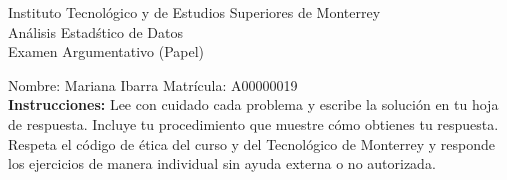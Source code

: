 \documentclass[10pt]{report}
\begin{document}
\newpage



\begin{center}
{\large Instituto Tecnol\'{o}gico y de Estudios Superiores de Monterrey \\
An\'alisis Estad\'stico de Datos } \\
Examen Argumentativo (Papel)
\end{center}

Nombre: \underline{\hspace*{.2in}}
Mariana Ibarra
\underline{\hspace*{.2in}} \quad Matr\'icula:\underline{\hspace*{.2in}}
A00000019
\underline{\hspace*{.2in}} \\

{\bf Instrucciones:} Lee con cuidado cada problema y escribe la soluci\'on
en tu hoja de respuesta. Incluye tu procedimiento que muestre c\'omo obtienes tu respuesta.  Respeta el c\'odigo de \'etica del curso y del Tecnol\'ogico de Monterrey y responde los ejercicios de manera individual sin ayuda externa o no autorizada.
\end{document}
